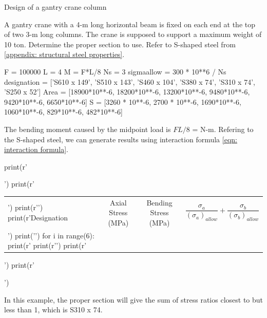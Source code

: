 \documentclass[
10pt,
a4paper,
openany,
svgnames,
]{book}
\begin{document}
\begin{example} Design of a gantry crane column

  A gantry crane with a 4-m long horizontal beam is fixed on each end at the top of two 3-m long columns. The crane is supposed to support a maximum weight of 10 ton. Determine the proper section to use. Refer to S-shaped steel from \cref{appendix: structural steel properties}.

  \begin{pycode}
    F = 100000
    L = 4
    M = F*L/8
    Ns = 3 
    sigmaallow = 300 * 10**6 / Ns
    designation = ['S610 x 149', 'S510 x 143', 'S460 x 104', 'S380 x 74', 'S310 x 74', 'S250 x 52']
    Area = [18900*10**-6, 18200*10**-6, 13200*10**-6, 9480*10**-6, 9420*10**-6, 6650*10**-6]
    S = [3260 * 10**-6, 2700 * 10**-6, 1690*10**-6, 1060*10**-6, 829*10**-6, 482*10**-6]
  \end{pycode}

  The bending moment caused by the midpoint load is $FL/8$ =  N-m. Refering to the S-shaped steel, we can generate results using interaction formula \cref{eqn: interaction formula}.

  \begin{pycode}
    print(r'\begin{center}')
    print(r'\begin{tabular}{lccc}')
    print(r'\toprule')
    print(r'Designation & Axial Stress (MPa) & Bending Stress (MPa) & $\dfrac{\sigma _a}{(\sigma_a)_{allow}} + \dfrac{\sigma_b}{(\sigma_b)_{allow}}$ \\')
    print('\midrule')
    for i in range(6):
        print(r'%
    print(r'\bottomrule')
    print(r'\end{tabular}')
    print(r'\end{center}')
  \end{pycode}

  In this example, the proper section will give the sum of stress ratios closest to but less than 1, which is S310 x 74.
\end{example}
\end{document}
